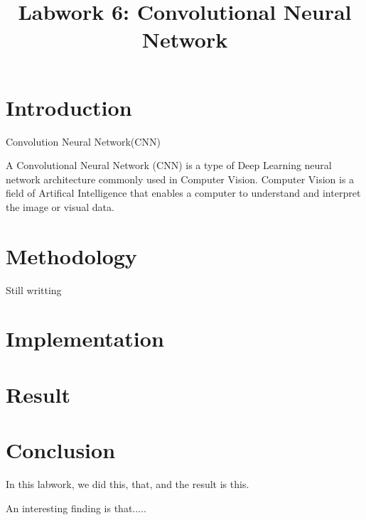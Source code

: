 \documentclass{article}
\title{Labwork 6: Convolutional Neural Network}
\begin{document}
\maketitle

\setlength\parindent{0pt}

\section{Introduction}

Convolution Neural Network(CNN)

A Convolutional Neural Network (CNN) is a type of Deep Learning neural network architecture commonly used in Computer Vision. Computer Vision is a field of Artifical Intelligence that enables a computer to understand and interpret the image or visual data.

\section{Methodology}

Still writting

\section{Implementation}


\section{Result}

\section{Conclusion}

In this labwork, we did this, that, and the result is this.

An interesting finding is that.....
\end{document}
